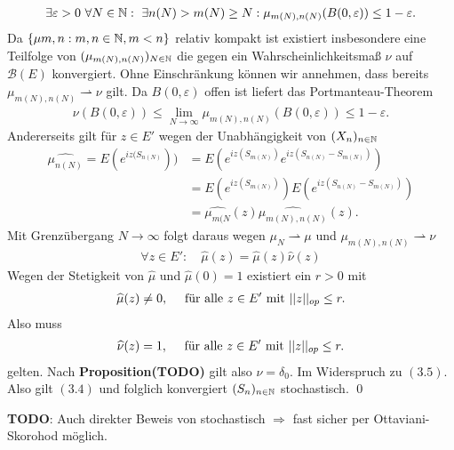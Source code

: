 \begin{proof*}
    \begin{align*}
        \exists \varepsilon > 0 \ \forall N \in \mathbb{N}: \ \exists n(N) > m(N) \geq N: \mu_{m(N), n(N)}(B(0, \varepsilon)) \leq 1 - \varepsilon.
    \end{align*}
    Da $\{\mu{m,n}: m,n \in \mathbb{N}, m < n \}$ relativ kompakt ist existiert insbesondere eine Teilfolge von $(\mu_{m(N),n(N)})_{N \in \mathbb{N}}$ die gegen ein Wahrscheinlichkeitsmaß $\nu$ auf $\mathcal{B}(E)$ konvergiert.
    Ohne Einschränkung können wir annehmen, dass bereits $\mu_{m(N),n(N)} \rightharpoonup \nu$ gilt. Da $B(0, \varepsilon)$ offen ist liefert das Portmanteau-Theorem
    \begin{align}
        \nu(B(0, \varepsilon)) \leq \lim_{N \to \infty}\mu_{m(N),n(N)}(B(0,\varepsilon)) \leq 1 - \varepsilon. 
    \end{align}
    Andererseits gilt für $z \in E'$ wegen der Unabhängigkeit von $(X_n)_{n \in \mathbb{N}}$
    \begin{align*}
        \widehat{\mu_{n(N)}} = E(e^{iz(S_{n(N)}})) &= E(e^{iz(S_{m(N)})}e^{iz(S_{n(N)} - S_{m(N)})}) \\\
                                                   &= E(e^{iz(S_{m(N)})})E(e^{iz(S_{n(N)} - S_{m(N)})}) \\\
                                                   &= \widehat{\mu_{m(N}}(z)\widehat{\mu_{m(N),n(N)}}(z). 
    \end{align*}
    Mit Grenzübergang $N \to \infty$ folgt daraus wegen $\mu_N \rightharpoonup \mu$ und $\mu_{m(N),n(N)} \rightharpoonup \nu$
    \begin{align*}
        \forall z \in E': \quad \widehat{\mu}(z) = \widehat{\mu}(z) \widehat{\nu}(z)
    \end{align*}
    Wegen der Stetigkeit von $\widehat{\mu}$ und $\widehat{\mu}(0) = 1$ existiert ein $r>0$ mit 
    \begin{align*}
        \widehat{\mu}(z) \neq 0, \quad \text{ für alle } z \in E' \text{ mit } \lvert\lvert z \rvert\rvert_{op} \leq r. 
    \end{align*}
    Also muss 
    \begin{align*}
        \widehat{\nu}(z) = 1, \quad \text{ für alle } z \in E' \text{ mit } \lvert\lvert z \rvert\rvert_{op} \leq r. 
    \end{align*}
    gelten. Nach \textbf{Proposition(TODO)} gilt also $\nu = \delta_0$. Im Widerspruch zu $(3.5)$. Also gilt $(3.4)$ und folglich konvergiert $(S_n)_{n \in \mathbb{N}}$ stochastisch. 
    \qed
\end{proof*}

\begin{remark}
    \textbf{TODO}: Auch direkter Beweis von stochastisch $\Rightarrow$ fast sicher per Ottaviani-Skorohod möglich.
\end{remark}



